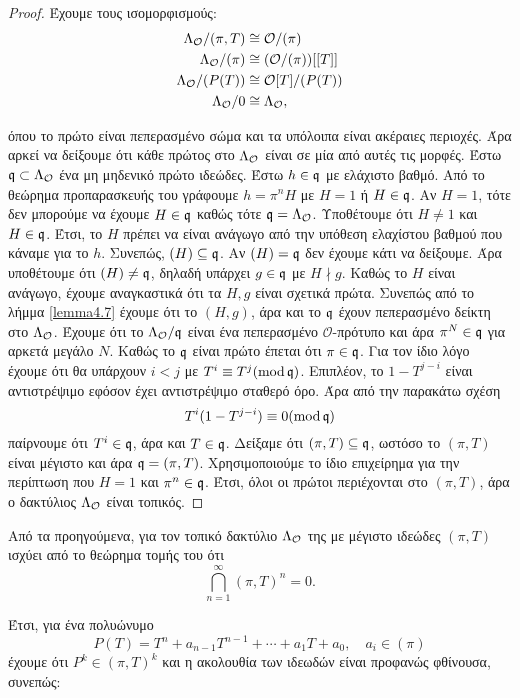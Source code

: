 \begin{proof}
    Έχουμε τους ισομορφισμούς:
    \begin{align*}
    \Lambda_\mathcal{O}/(\pi,T) &\cong \mathcal{O}/(\pi) \\
    \Lambda_\mathcal{O}/(\pi) &\cong (\mathcal{O}/(\pi))[[T]] \\
    \Lambda_\mathcal{O}/(P(T)) &\cong \mathcal{O}[T]/(P(T)) \\
    \Lambda_\mathcal{O}/0 &\cong \Lambda_\mathcal{O} ,
    \end{align*}

    \noindent όπου το πρώτο είναι πεπερασμένο σώμα και τα υπόλοιπα είναι ακέραιες περιοχές. Άρα αρκεί να δείξουμε ότι κάθε πρώτος στο $\Lambda_\mathcal{O}$ είναι σε μία από αυτές τις μορφές. Έστω $\mathfrak{q} \subset \Lambda_\mathcal{O}$ ένα μη μηδενικό πρώτο ιδεώδες. Έστω $h \in \mathfrak{q}$ με ελάχιστο βαθμό. Από το θεώρημα προπαρασκευής του  γράφουμε $h = \pi^n H$ με $H=1$ ή $H \in \mathfrak{q}$. Αν $H=1$, τότε δεν μπορούμε να έχουμε $H \in \mathfrak{q}$ καθώς τότε $\mathfrak{q} = \Lambda_\mathcal{O}$. Υποθέτουμε ότι $H\neq 1$ και $H\in \mathfrak{q}$. Έτσι, το $H$ πρέπει να είναι ανάγωγο από την υπόθεση ελαχίστου βαθμού που κάναμε για το $h$. Συνεπώς, $(H)\subseteq \mathfrak{q}$. Αν $(H) = \mathfrak{q}$ δεν έχουμε κάτι να δείξουμε. Άρα υποθέτουμε ότι $(H)\neq \mathfrak{q}$, δηλαδή υπάρχει $g \in \mathfrak{q}$ με $H\nmid g$. Καθώς το $H$ είναι ανάγωγο, έχουμε αναγκαστικά ότι τα $H,g$ είναι σχετικά πρώτα. Συνεπώς από το λήμμα \ref{lemma4.7} έχουμε ότι το $(H,g)$, άρα και το $\mathfrak{q}$ έχουν πεπερασμένο δείκτη στο $\Lambda_\mathcal{O}$. Έχουμε ότι το $\Lambda_\mathcal{O}/\mathfrak{q}$ είναι ένα πεπερασμένο $\mathcal{O}$-πρότυπο και άρα $\pi^N \in \mathfrak{q}$ για αρκετά μεγάλο $N$. Καθώς το $\mathfrak{q}$ είναι πρώτο έπεται ότι $\pi \in \mathfrak{q}$. Για τον ίδιο λόγο έχουμε ότι θα υπάρχουν $i<j$ με $T^i \equiv T^j (\operatorname{mod}\mathfrak{q})$. Επιπλέον, το $1-T^{j-i}$ είναι αντιστρέψιμο εφόσον έχει αντιστρέψιμο σταθερό όρο. Άρα από την παρακάτω σχέση
    $$ T^i (1- T^{j-i}) \equiv 0 (\operatorname{mod}\mathfrak{q}) $$
    παίρνουμε ότι $T^i \in \mathfrak{q}$, άρα και $T \in \mathfrak{q}$. Δείξαμε ότι $(\pi,T) \subseteq \mathfrak{q}$, ωστόσο το $(\pi,T)$ είναι μέγιστο και άρα $\mathfrak{q} = (\pi,T)$. Χρησιμοποιούμε το ίδιο επιχείρημα για την περίπτωση που $H=1$ και $\pi^n \in \mathfrak{q}$. Έτσι, όλοι οι πρώτοι περιέχονται στο $(\pi,T)$, άρα ο δακτύλιος $\Lambda_\mathcal{O}$ είναι τοπικός.
\end{proof}

\noindent Από τα προηγούμενα, για τον τοπικό δακτύλιο $\Lambda_\mathcal{O}$ της  με μέγιστο ιδεώδες $(\pi,T)$ ισχύει από το θεώρημα τομής του  ότι
$$\bigcap \limits_{n=1}^\infty (\pi,T)^n = 0.$$


\noindent Έτσι, για ένα  πολυώνυμο
$$P(T) = T^n + a_{n-1}T^{n-1} + \cdots + a_1 T + a_0, \quad a_i \in (\pi)$$
έχουμε ότι $P^k \in (\pi,T)^k$ και η ακολουθία των ιδεωδών είναι προφανώς φθίνουσα, συνεπώς:

